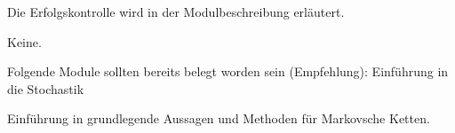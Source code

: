 \begin{course}

\setdoclanguagegerman
{}


\courselevel{}
\courseinstructionlanguage{}

\coursehead


\label{cour_8045.dp_997}


\begin{styleenv}
\begin{assessment}
Die Erfolgskontrolle wird in der Modulbeschreibung erläutert.


\end{assessment}

\begin{conditions}Keine.\end{conditions}

\begin{recommendations}Folgende Module sollten bereits belegt worden sein (Empfehlung):\newline
Einführung in die Stochastik

\end{recommendations}
\end{styleenv}

\begin{learningoutcomes}
Einführung in grundlegende Aussagen und Methoden für Markovsche Ketten.


\end{learningoutcomes}


\end{course}
